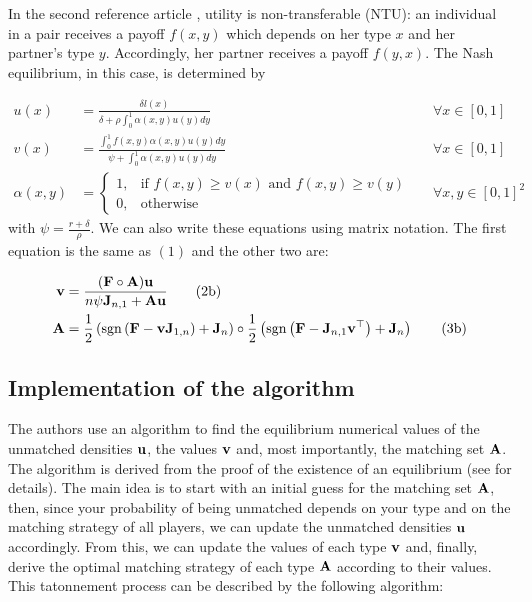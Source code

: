 In the second reference article \citep{smith_marriage_2006}, utility is non-transferable (NTU): an individual in a pair receives a payoff $f(x,y)$ which depends on her type $x$ and her partner's type $y$. Accordingly, her partner receives a payoff $f(y,x)$. The Nash equilibrium, in this case, is determined by

\begin{align*}[left=\empheqlbrace]
	u(x) &= \frac{\delta l(x)}{\delta + \rho \int_{0}^{1} \alpha(x,y) u(y) dy} &&\forall x \in [0,1]\\
	v(x) &= \frac{\int_{0}^{1} f(x,y) \alpha(x,y) u(y) dy}{\psi + \int_{0}^{1} \alpha(x,y) u(y) dy} &&\forall x \in [0,1]\\
	\alpha(x,y) &=
	\begin{cases}
    	1, & \text{if } f(x,y) \geq v(x) \text{ and } f(x,y) \geq v(y)\\
    	0, & \text{otherwise}
	\end{cases}
	&&\forall x,y \in [0,1]^2 
\end{align*}
with $\psi = \frac{r+\delta}{\rho}$. We can also write these equations using matrix notation. The first equation is the same as $(1)$ and the other two are:

\begin{align}[left=\empheqlbrace]
	\vect{v} &= \frac{(\vect{F} \circ \vect{A})\vect{u}}{n \psi \vect{J}_{n,1} + \vect{A} \vect{u}}
	\tag{2b}\\
	\vect{A} &= \frac{1}{2} \left(\sgn{\left( \vect{F} - \vect{v} \vect{J}_{1,n} \right)} + \vect{J}_n \right) \circ \frac{1}{2} \left(\sgn{\left( \vect{F} - \vect{J}_{n,1} \vect{v}^\top \right)} + \vect{J}_n \right)
	\tag{3b}
\end{align}





\subsection*{Implementation of the algorithm}

The authors use an algorithm to find the equilibrium numerical values of the unmatched densities $\boldsymbol{\mathbf{u}}$, the values $\boldsymbol{\mathbf{v}}$ and, most importantly, the matching set $\boldsymbol{\mathbf{A}}$. The algorithm is derived from the proof of the existence of an equilibrium (see \citep{smith_frictional_2011} for details). The main idea is to start with an initial guess for the matching set $\boldsymbol{\mathbf{A}}$, then, since your probability of being unmatched depends on your type and on the matching strategy of all players, we can update the unmatched densities $\boldsymbol{\mathbf{u}}$ accordingly. From this, we can update the values of each type $\boldsymbol{\mathbf{v}}$ and, finally, derive the optimal matching strategy of each type $\boldsymbol{\mathbf{A}}$ according to their values. This tatonnement process can be described by the following algorithm:

